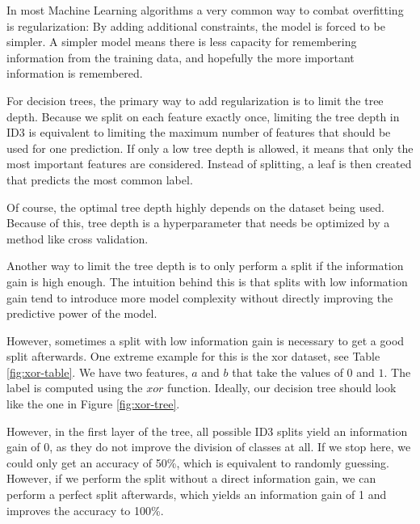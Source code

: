 \documentclass[a4paper]{article}
\begin{document}
In most Machine Learning algorithms a very common way to combat overfitting is regularization: By adding additional constraints, the model is forced to be simpler. A simpler model means there is less capacity for remembering information from the training data, and hopefully the more important information is remembered.

For decision trees, the primary way to add regularization is to limit the tree depth. Because we split on each feature exactly once, limiting the tree depth in ID3 is equivalent to limiting the maximum number of features that should be used for one prediction. If only a low tree depth is allowed, it means that only the most important features are considered. Instead of splitting, a leaf is then created that predicts the most common label.

Of course, the optimal tree depth highly depends on the dataset being used. Because of this, tree depth is a hyperparameter that needs be optimized by a method like cross validation.

Another way to limit the tree depth is to only perform a split if the information gain is high enough. The intuition behind this is that splits with low information gain tend to introduce more model complexity without directly improving the predictive power of the model.

However, sometimes a split with low information gain is necessary to get a good split afterwards. One extreme example for this is the xor dataset, see Table \ref{fig:xor-table}. We have two features, $a$ and $b$ that take the values of $0$ and $1$. The label is computed using the $\mathit{xor}$ function. Ideally, our decision tree should look like the one in Figure \ref{fig:xor-tree}.

However, in the first layer of the tree, all possible ID3 splits yield an information gain of $0$, as they do not improve the division of classes at all. If we stop here, we could only get an accuracy of 50\%, which is equivalent to randomly guessing. However, if we perform the split without a direct information gain, we can perform a perfect split afterwards, which yields an information gain of 1 and improves the accuracy to 100\%.

\begin{figure}
\begin{floatrow}
\end{floatrow}
\end{figure}
\end{document}
